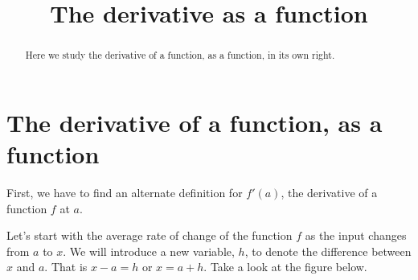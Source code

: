 \documentclass{ximera}
\title[Dig-in:]{The derivative as a function}
\begin{document}
\begin{abstract}
Here we study the derivative of a function, as a function, in its own
right.
\end{abstract}
\maketitle

\section{The derivative of a function, as a function}
First, we have to find an alternate definition for $f'(a)$, the derivative of a function $f$  at $a$.

 Let's start with
the average rate of change of the function $f$ as the input changes from $a$ to $x$. We will introduce a new variable, $h$, to denote the difference between $x$ and $a$. That
is $x-a=h$ or $x=a+h$. Take a look at the figure below.
\end{document}
